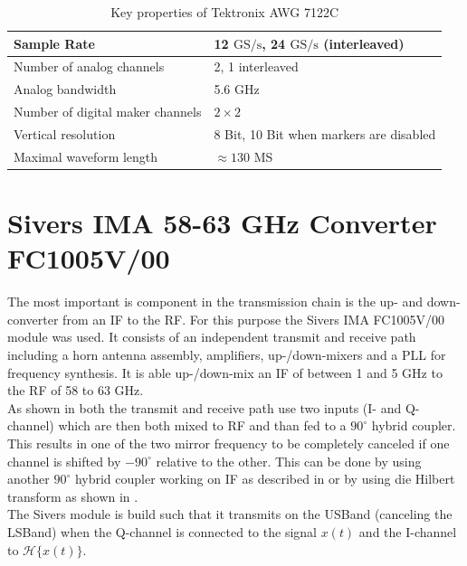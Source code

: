 \begin{table}[h]
  \centering
  \begin{tabular}{|l|l|}
    \hline
    Sample Rate & 12 $\text{GS}/\text{s}$, 24 $\text{GS}/\text{s}$ (interleaved) \\ \hline
    Number of analog channels & 2, 1 interleaved \\ \hline
    Analog bandwidth & 5.6 GHz \\ \hline
    Number of digital maker channels & $2 \times 2$ \\ \hline
    Vertical resolution & 8 Bit, 10 Bit when markers are disabled \\ \hline
    Maximal waveform length & $\approx 130$ MS  \\ \hline
  \end{tabular}
  \caption{Key properties of Tektronix AWG 7122C}
  \label{tab:awg}
\end{table}

\section{Sivers IMA 58-63 GHz Converter FC1005V/00}
\label{sec:comp_sivers}
The most important is component in the transmission chain is the
up- and down-converter from an \acrfull{IF} to the \acrfull{RF}.
For this purpose the Sivers IMA FC1005V/00 module was used.
It consists of an independent transmit and receive path including
a horn antenna assembly, amplifiers, up-/down-mixers and a \gls{PLL}
for frequency synthesis. It is able up-/down-mix an \gls{IF}
of between 1 and 5 GHz to the \gls{RF} of 58 to 63 GHz. \\

As shown in  both the transmit and receive path
use two inputs (I- and Q-channel) which are then both mixed to
\gls{RF} and than fed to a $90^\circ$ hybrid coupler. \\
This results in one of the two mirror frequency to be completely canceled
if one channel is shifted by $-90^\circ$ relative to the other.
This can be done by using another $90^\circ$ hybrid coupler working on
\gls{IF} as described in  or by using die Hilbert
transform as shown in . \\
The Sivers module is build such that it transmits on the \gls{USBand}
(canceling the \gls{LSBand}) when the Q-channel is connected to the signal
$x(t)$ and the I-channel to $\mathcal{H}\{x(t)\}$.
 \\

